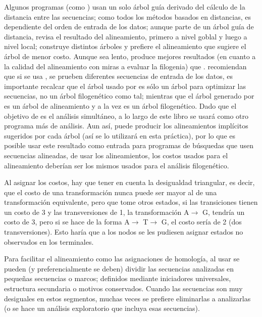 Algunos programas (como ) usan un solo \'arbol gu\'ia derivado del c\'alculo de la distancia entre las 
secuencias; como todos los m\'etodos basados en distancias, es dependiente del orden de entrada de los datos;  aunque parte de un \'arbol gu\'ia de  distancia, revisa el resultado del alineamiento, primero a nivel goblal y luego a nivel local;   construye distintos \'arboles y prefiere el alineamiento que sugiere el \'arbol de menor costo. Aunque sea lento,  produce mejores resultados (en cuanto a la calidad del alineamiento con miras a evaluar la filogenia) que . \cite{Giribet1999} recomiendan que si se usa , se prueben diferentes secuencias de entrada de los datos, es importante recalcar que el \'arbol usado por  es s\'olo un \'arbol para optimizar las secuencias, no un \'arbol filogen\'etico como tal; 
mientras que el \'arbol generado por  es un \'arbol de alineamiento y a la vez es un \'arbol filogen\'etico. Dado que el objetivo de  es el an\'alisis simult\'aneo, a lo largo de este libro se usar\'a  como otro programa m\'as de an\'alisis. Aun as\'i,  puede producir los alineamientos impl\'icitos sugeridos por cada \'arbol (as\'i se lo utilizar\'a en esta pr\'actica), por lo que es posible usar este resultado como entrada para programas de b\'usquedas que usen secuencias alineadas, de usar los alineamientos, los costos usados para el alineamiento deber\'ian ser los mismos usados para el an\'alisis filogen\'etico. 

Al asignar los costos, hay que tener en cuenta la desigualdad triangular,  es decir, que el costo de una transformaci\'on nunca puede ser mayor al de una transformaci\'on equivalente, pero que tome otros estados,  si las transiciones tienen un costo de 3 y las transversiones de 1, la transformaci\'on A$\rightarrow$ G, tendr\'ia un costo de 3, pero si se hace de la forma A$\rightarrow$ T$\rightarrow$ G, el costo ser\'ia de 2 (dos transversiones). Esto har\'ia que a los nodos se les pudiesen asignar estados no observados en los terminales.


Para facilitar el alineamiento como las asignaciones de homolog\'ia, al usar  se pueden (y preferencialmente se deben) dividir las secuencias analizadas en peque\~nas secuencias o marcos; definidos mediante iniciadores universales, estructura secundaria o motivos conservados. Cuando las secuencias son muy desiguales en estos segmentos, muchas veces se prefiere eliminarlas a analizarlas (o se hace un an\'alisis exploratorio que incluya esas secuencias).


